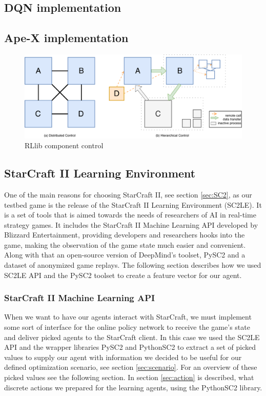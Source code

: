 \documentclass[12pt,a4paper]{article}
\begin{document}
\subsection{DQN implementation}

\subsection{Ape-X implementation}

\begin{figure}
    \centering
    \includegraphics[width=\linewidth]{Figures/DRL_Control_Model.pdf}
    \caption{RLlib component control \cite{Liang2017}}
    \label{fig:DRL_control_model}
\end{figure}
\subsection{StarCraft II Learning Environment}
One of the main reasons for choosing StarCraft II, see section \ref{sec:SC2}, as our testbed game is the release of the StarCraft II Learning Environment (SC2LE). It is a set of tools that is aimed towards the needs of researchers of AI in real-time strategy games. It includes the StarCraft II Machine Learning API developed by Blizzard Entertainment, providing developers and researchers hooks into the game, making the observation of the game state much easier and convenient. Along with that an open-source version of DeepMind's toolset, PySC2 and a dataset of anonymized game replays. The following section describes how we used SC2LE API and the PySC2 toolset to create a feature vector for our agent.
\label{sec:SC2API}
\subsubsection{StarCraft II Machine Learning API}
When we want to have our agents interact with StarCraft, we must implement some sort of interface for the online policy network to receive the game's state and deliver picked agents to the StarCraft client. In this case we used the SC2LE API and the wrapper libraries PySC2 and PythonSC2 to extract a set of picked values to supply our agent with information we decided to be useful for our defined optimization scenario, see section \ref{sec:scenario}. For an overview of these picked values see the following section. In section \ref{sec:action} is described, what discrete actions we prepared for the learning agents, using the PythonSC2 library.
\end{document}

